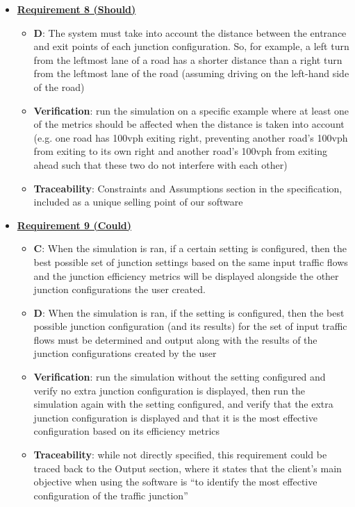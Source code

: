 \documentclass{article}
\begin{document}
\begin{itemize}
    \item \textbf{\underline{Requirement 8 (Should)}}
    \begin{itemize}
        \item \textbf{D}: The system must take into account the distance between the entrance and exit 
            points of each junction configuration. So, for example, a left turn from the 
            leftmost lane of a road has a shorter distance than a right turn from the leftmost 
            lane of the road (assuming driving on the left-hand side of the road)
        \item \textbf{Verification}: run the simulation on a specific example where at least one of 
            the metrics should be affected when the distance is taken into account (e.g. one 
            road has 100vph exiting right, preventing another road’s 100vph from exiting to its
            own right and another road’s 100vph from exiting ahead such that these two do not 
            interfere with each other)
        \item\textbf{Traceability}: Constraints and Assumptions section in the specification, included 
            as a unique selling point of our software
    \end{itemize}

    \item \textbf{\underline{Requirement 9 (Could)}}
    \begin{itemize}
        \item \textbf{C}: When the simulation is ran, if a certain setting is configured, then the best 
            possible set of junction settings based on the same input traffic flows and the 
            junction efficiency metrics will be displayed alongside the other junction 
            configurations the user created.
        \item \textbf{D}: When the simulation is ran, if the setting is configured, then the best 
            possible junction configuration (and its results) for the set of input traffic 
            flows must be determined and output along with the results of the junction 
            configurations created by the user
        \item \textbf{Verification}: run the simulation without the setting configured and verify 
            no extra junction configuration is displayed, then run the simulation again with 
            the setting configured, and verify that the extra junction configuration is displayed 
            and that it is the most effective configuration based on its efficiency metrics
        \item\textbf{Traceability}: while not directly specified, this requirement could be traced back 
            to the Output section, where it states that the client’s main objective when using 
            the software is “to identify the most effective configuration of the traffic junction”
    \end{itemize}


\end{itemize}
\end{document}
